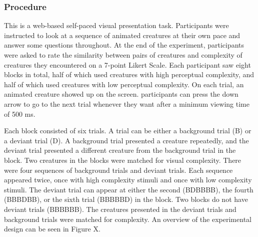 \documentclass[10pt, letterpaper]{article}
\begin{document}
\hypertarget{procedure}{%
\subsubsection{Procedure}\label{procedure}}

This is a web-based self-paced visual presentation task. Participants
were instructed to look at a sequence of animated creatures at their own
pace and answer some questions throughout. At the end of the experiment,
participants were asked to rate the similarity between pairs of
creatures and complexity of creatures they encountered on a 7-point
Likert Scale. Each participant saw eight blocks in total, half of which
used creatures with high perceptual complexity, and half of which used
creatures with low perceptual complexity. On each trial, an animated
creature showed up on the screen. participants can press the down arrow
to go to the next trial whenever they want after a minimum viewing time
of 500 ms.

Each block consisted of six trials. A trial can be either a background
trial (B) or a deviant trial (D). A background trial presented a
creature repeatedly, and the deviant trial presented a different
creature from the background trial in the block. Two creatures in the
blocks were matched for visual complexity. There were four sequences of
background trials and deviant trials. Each sequence appeared twice, once
with high complexity stimuli and once with low complexity stimuli. The
deviant trial can appear at either the second (BDBBBB), the fourth
(BBBDBB), or the sixth trial (BBBBBD) in the block. Two blocks do not
have deviant trials (BBBBBB). The creatures presented in the deviant
trials and background trials were matched for complexity. An overview of
the experimental design can be seen in Figure X.
\end{document}
